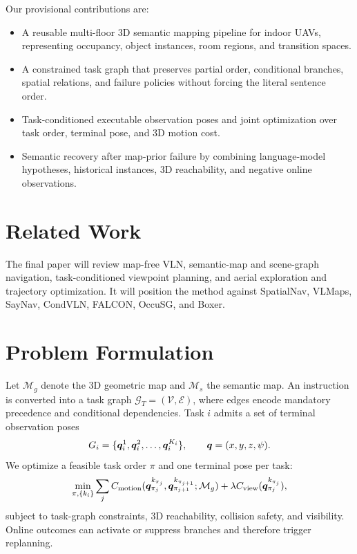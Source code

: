 \documentclass[11pt]{article}
\begin{document}
Our provisional contributions are:
\begin{itemize}[leftmargin=*]
  \item A reusable multi-floor 3D semantic mapping pipeline for indoor UAVs, representing occupancy, object instances, room regions, and transition spaces.
  \item A constrained task graph that preserves partial order, conditional branches, spatial relations, and failure policies without forcing the literal sentence order.
  \item Task-conditioned executable observation poses and joint optimization over task order, terminal pose, and 3D motion cost.
  \item Semantic recovery after map-prior failure by combining language-model hypotheses, historical instances, 3D reachability, and negative online observations.
\end{itemize}

\section{Related Work}
The final paper will review map-free VLN, semantic-map and scene-graph navigation, task-conditioned viewpoint planning, and aerial exploration and trajectory optimization. It will position the method against SpatialNav, VLMaps, SayNav, CondVLN, FALCON, OccuSG, and Boxer. 

\section{Problem Formulation}
Let $\mathcal{M}_g$ denote the 3D geometric map and $\mathcal{M}_s$ the semantic map. An instruction is converted into a task graph $\mathcal{G}_T=(\mathcal{V},\mathcal{E})$, where edges encode mandatory precedence and conditional dependencies. Task $i$ admits a set of terminal observation poses
\begin{equation}
G_i=\{\bm{q}_i^1,\bm{q}_i^2,\ldots,\bm{q}_i^{K_i}\},\qquad
\bm{q}=(x,y,z,\psi).
\end{equation}
We optimize a feasible task order $\pi$ and one terminal pose per task:
\begin{equation}
\min_{\pi,\{k_i\}}\sum_j C_{\mathrm{motion}}
(\bm{q}_{\pi_j}^{k_{\pi_j}},\bm{q}_{\pi_{j+1}}^{k_{\pi_{j+1}}};\mathcal{M}_g)
+\lambda C_{\mathrm{view}}(\bm{q}_{\pi_j}^{k_{\pi_j}}),
\end{equation}
subject to task-graph constraints, 3D reachability, collision safety, and visibility. Online outcomes can activate or suppress branches and therefore trigger replanning.
\end{document}

